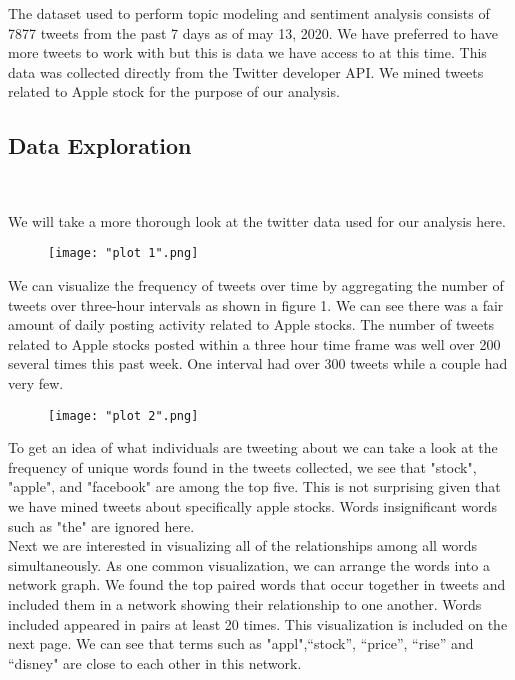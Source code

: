 \documentclass[11pt, oneside]{article}   	%
\begin{document}
  The dataset used to perform topic modeling and sentiment analysis consists of 7877 tweets from the past 7 days as of may 13, 2020. We have preferred to have more tweets to work with but this is data we have access to at this time. This data was collected directly from the Twitter developer API. We mined tweets related to Apple stock for the purpose of our analysis.

\newpage

\subsection{Data Exploration} \

 We will take a more thorough look at the twitter data used for our analysis here. 
 
\begin{figure}[htbp] %
   \centering
   \texttt{[image: "plot 1".png]} 
\end{figure}

\FloatBarrier



  We can visualize the frequency of tweets over time by aggregating the number of tweets over three-hour intervals as shown in figure 1. We can see there was a fair amount of daily posting activity related to Apple stocks. The number of tweets related to Apple stocks posted within a three hour time frame was well over 200 several times this past week. One interval had over 300 tweets while a couple had very few.
  
\begin{figure}[h] %
   \centering
   \texttt{[image: "plot 2".png]} 
\end{figure}

\FloatBarrier

To get an idea of what individuals are tweeting about we can take a look at the frequency of unique words found in the tweets collected, we see that "stock", "apple", and "facebook" are among the top five. This is not surprising given that we have mined tweets about specifically apple stocks. Words insignificant words such as "the" are ignored here. \\

Next we are interested in visualizing all of the relationships among all words simultaneously. As one common visualization, we can arrange the words into a network graph. We found the top paired words that occur together in tweets and included them in a network showing their relationship to one another. Words included appeared in pairs at least 20 times. This visualization is included on the next page. We can see that terms such as "appl",“stock”, “price”, “rise” and “disney" are close to each other in this network. 
\end{document}
